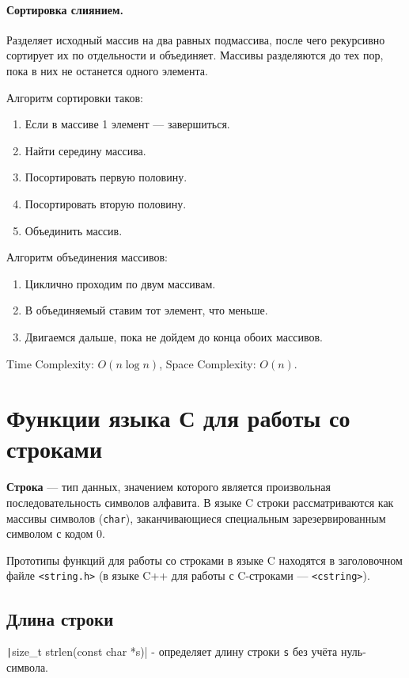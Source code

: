 \paragraph{Сортировка слиянием.}
Разделяет исходный массив на два равных подмассива, после чего рекурсивно сортирует их по отдельности и объединяет.
Массивы разделяются до тех пор, пока в них не останется одного элемента.

Алгоритм сортировки таков:
\begin{enumerate}
  \item Если в массиве 1 элемент --- завершиться.
  \item Найти середину массива.
  \item Посортировать первую половину.
  \item Посортировать вторую половину.
  \item Объединить массив.
\end{enumerate}

Алгоритм объединения массивов:
\begin{enumerate}
  \item Циклично проходим по двум массивам.
  \item В объединяемый ставим тот элемент, что меньше.
  \item Двигаемся дальше, пока не дойдем до конца обоих массивов.
\end{enumerate}

Time Complexity: $O(n\log n)$, Space Complexity: $O(n)$.


\section{Функции языка С для работы со строками}
\textbf{Строка} --- тип данных, значением которого является произвольная последовательность
символов алфавита.
В языке C строки рассматриваются как массивы символов (\verb|char|), заканчивающиеся
специальным зарезервированным символом с кодом 0.

Прототипы функций для работы со строками в языке C находятся в заголовочном файле \verb|<string.h>|
(в языке C++ для работы с C-строками --- \verb|<cstring>|).

\subsection{Длина строки}
\texttt|size_t strlen(const char *s)| - определяет длину строки \verb|s| без учёта нуль-символа.

